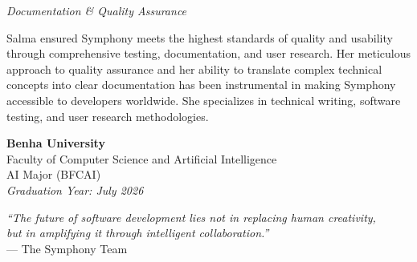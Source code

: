 \begin{description}[leftmargin=4cm,labelwidth=3.5cm,itemsep=1.5cm]
\item[\textbf{\textcolor{brandPrimary}{SALMA}}] 
\textit{Documentation \& Quality Assurance}

Salma ensured Symphony meets the highest standards of quality and usability through comprehensive testing, documentation, and user research. Her meticulous approach to quality assurance and her ability to translate complex technical concepts into clear documentation has been instrumental in making Symphony accessible to developers worldwide. She specializes in technical writing, software testing, and user research methodologies.

\end{description}

\vspace{2cm}

\begin{center}
\begin{tcolorbox}[
    enhanced,
    colback=brandPrimary!5,
    colframe=brandPrimary!30,
    boxrule=1pt,
    arc=8pt,
    left=2cm,
    right=2cm,
    top=1cm,
    bottom=1cm
]
\begin{center}
{\large\textbf{\textcolor{brandPrimary}{Benha University}}}\\
\vspace{0.3cm}
{\textcolor{brandSecondary}{Faculty of Computer Science and Artificial Intelligence}}\\
{\textcolor{brandAccent}{AI Major (BFCAI)}}\\
\vspace{0.5cm}
{\textit{\textcolor{brandTertiary}{Graduation Year: July 2026}}}
\end{center}
\end{tcolorbox}
\end{center}

\vspace{1cm}

\begin{center}
\textit{\textcolor{brandSecondary}{``The future of software development lies not in replacing human creativity,\\
but in amplifying it through intelligent collaboration.''}}\\
\vspace{0.5cm}
\textcolor{brandAccent}{— The Symphony Team}
\end{center}

\clearpage